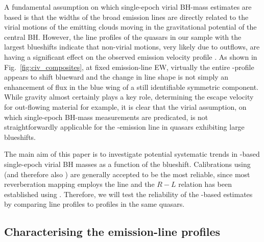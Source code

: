 A fundamental assumption on which single-epoch virial BH-mass estimates are based is that the widths of the broad emission lines are directly related to the virial motions of the emitting clouds moving in the gravitational potential of the central BH. 
However, the  line profiles of the quasars in our sample with the largest  blueshifts indicate that non-virial motions, very likely due to outflows, are having a significant effect on the observed  emission velocity profile \citep[e.g.][]{gaskell82,baskin05,sulentic07,richards11,wang13}.  
As shown in Fig.~\ref{fig:civ_composites}, at fixed emission-line EW, virtually the entire -profile appears to shift blueward and the change in line shape is not simply an enhancement of flux in the blue wing of a still identifiable symmetric component. 
While gravity almost certainly plays a key role, determining the escape velocity for out-flowing material for example, it is clear that the virial assumption, on which single-epoch BH-mass measurements are predicated, is not straightforwardly applicable for the -emission line in quasars exhibiting large blueshifts. 

The main aim of this paper is to investigate potential systematic trends in -based single-epoch virial BH masses as a function of the  blueshift. 
Calibrations using \hb (and therefore also \hans) are generally accepted to be the most reliable, since most reverberation mapping employs the \hb line and the $R-L$ relation has been established using \hbns.
Therefore, we will test the reliability of the -based estimates by comparing  line profiles to \ha profiles in the same quasars. 

\subsection{Characterising the emission-line profiles}
\label{sub:charemprof}

